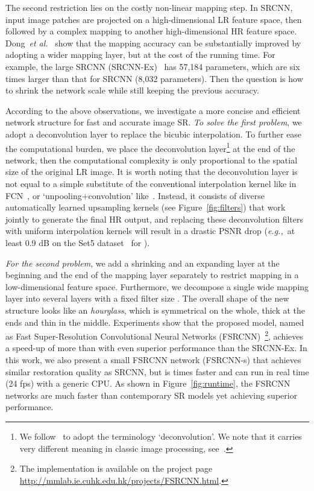 \documentclass[runningheads]{llncs}
\newcommand{\etal}{\emph{et al.}}
\newcommand{\eg}{\emph{e.g.,}}
\begin{document}
The second restriction lies on the costly non-linear mapping step. In SRCNN, input image patches are projected on a high-dimensional LR feature space, then followed by a complex mapping to another high-dimensional HR feature space. Dong~\etal~\cite{Dong2015} show that the mapping accuracy can be substantially improved by adopting a wider mapping layer, but at the cost of the running time. For example, the large SRCNN (SRCNN-Ex)~\cite{Dong2015} has 57,184 parameters, which are six times larger than that for SRCNN (8,032 parameters). Then the question is how to shrink the network scale while still keeping the previous accuracy.

According to the above observations, we investigate a more concise and efficient network structure for fast and accurate image SR.
\textit{To solve the first problem}, we adopt a deconvolution layer to replace the bicubic interpolation. To further ease the computational burden, we place the deconvolution layer\footnote{We follow~\cite{Zeiler2014} to adopt the terminology `deconvolution'. We note that it carries very different meaning in classic image processing, see~\cite{xu2014deep}.} at the end of the network, then the computational complexity is only proportional to the spatial size of the original LR image. It is worth noting that the deconvolution layer is not equal to a simple substitute of the conventional interpolation kernel like in FCN~\cite{Long2015}, or `unpooling+convolution' like~\cite{dosovitskiy2015learning}. Instead, it consists of diverse automatically learned upsampling kernels (see Figure~\ref{fig:filters}) that work jointly to generate the final HR output, and replacing these deconvolution filters with uniform interpolation kernels will result in a drastic PSNR drop (\eg~at least 0.9 dB on the Set5 dataset~\cite{Bevilacqua2012} for ).

\textit{For the second problem}, we add a shrinking and an expanding layer at the beginning and the end of the mapping layer separately to restrict mapping in a low-dimensional feature space. Furthermore, we decompose a single wide mapping layer into several layers with a fixed filter size . The overall shape of the new structure looks like an \textit{hourglass}, which is symmetrical on the whole, thick at the ends and thin in the middle. Experiments show that the proposed model, named as Fast Super-Resolution Convolutional Neural Networks (FSRCNN)~\footnote{The implementation is available on the project page \url{http://mmlab.ie.cuhk.edu.hk/projects/FSRCNN.html}.}, achieves a speed-up of more than  with even superior performance than the SRCNN-Ex. In this work, we also present a small FSRCNN network (FSRCNN-s) that achieves similar restoration quality as SRCNN, but is  times faster and can run in real time (24 fps) with a generic CPU.
As shown in Figure~\ref{fig:runtime}, the FSRCNN networks are much faster than contemporary SR models yet achieving superior performance.
\end{document}
